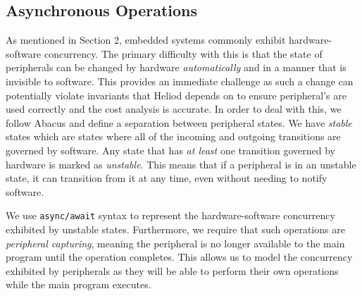 \subsection{Asynchronous Operations}
As mentioned in Section 2, embedded systems commonly exhibit hardware-software concurrency. The primary difficulty with this is that the state of peripherals can be changed by hardware \textit{automatically} and in a manner that is invisible to software. This provides an immediate challenge as such a change can potentially violate invariants that Heliod depends on to ensure peripheral's are used correctly and the cost analysis is accurate. In order to deal with this, we follow Abacus \cite{abacus} and define a separation between peripheral states. We have \textit{stable} states which are states where all of the incoming and outgoing transitions are governed by software. Any state that has \textit{at least} one transition governed by hardware is marked as \textit{unstable}. This means that if a peripheral is in an unstable state, it can transition from it at any time, even without needing to notify software. 

We use \texttt{async/await} syntax to represent the hardware-software concurrency exhibited by unstable states. Furthermore, we require that such operations are \textit{peripheral capturing}, meaning the peripheral is no longer available to the main program until the operation completes. This allows us to model the concurrency exhibited by peripherals as they will be able to perform their own operations while the main program executes. 

